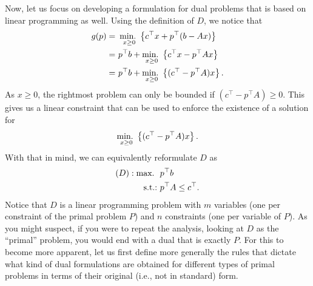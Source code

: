 Now, let us focus on developing a formulation for dual problems that is based on linear programming as well. Using the definition of $D$, we notice that
%
\begin{align*}
	g(p) = \ & \mathop{\text{min.~}}_{x \geq 0}  \left\{ c^\top x + p^\top (b - Ax) \right \}	\\
	= \ & p^\top b + \mathop{\text{min.~}}_{x \geq 0}  \left\{ c^\top x - p^\top Ax \right \}    \\
    = \ & p^\top b + \mathop{\text{min.~}}_{x \geq 0}  \left\{ (c^\top - p^\top A)x \right \}.  
\end{align*} 
%
As $x \ge 0$, the rightmost problem can only be bounded if $(c^\top - p^\top A) \ge 0$. This gives us a linear constraint that can be used to enforce the existence of a solution for 
%
\begin{equation*}
	\mathop{\text{min.~}}_{x \geq 0}  \left\{ (c^\top - p^\top A)x \right \}.
\end{equation*}
%
With that in mind, we can equivalently reformulate $D$ as
%
\begin{align*}
	(D) : \mathop{\text{max.~}} \ & p^\top b \\
	\mathop{\text{s.t.:~}} 	  & p^\top A \leq c^\top.
\end{align*}	
%
Notice that $D$ is a linear programming problem with $m$ variables (one per constraint of the primal problem $P$) and $n$ constraints (one per variable of $P$). As you might suspect, if you were to repeat the analysis, looking at $D$ as the ``primal'' problem, you would end with a dual that is exactly $P$. For this to become more apparent, let us first define more generally the rules that dictate what kind of dual formulations are obtained for different types of primal problems in terms of their original (i.e., not in standard) form. 

